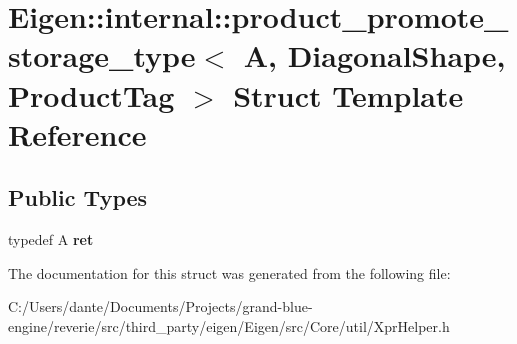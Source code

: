 \hypertarget{struct_eigen_1_1internal_1_1product__promote__storage__type_3_01_a_00_01_diagonal_shape_00_01_product_tag_01_4}{}\section{Eigen\+::internal\+::product\+\_\+promote\+\_\+storage\+\_\+type$<$ A, Diagonal\+Shape, Product\+Tag $>$ Struct Template Reference}
\label{struct_eigen_1_1internal_1_1product__promote__storage__type_3_01_a_00_01_diagonal_shape_00_01_product_tag_01_4}
\subsection*{Public Types}
\begin{DoxyCompactItemize}
\item 
\mbox{\label{struct_eigen_1_1internal_1_1product__promote__storage__type_3_01_a_00_01_diagonal_shape_00_01_product_tag_01_4_a290815d1c0a42b321007f57f6613c1e9}} 
typedef A {\bfseries ret}
\end{DoxyCompactItemize}


The documentation for this struct was generated from the following file\+:\begin{DoxyCompactItemize}
\item 
C\+:/\+Users/dante/\+Documents/\+Projects/grand-\/blue-\/engine/reverie/src/third\+\_\+party/eigen/\+Eigen/src/\+Core/util/Xpr\+Helper.\+h\end{DoxyCompactItemize}
